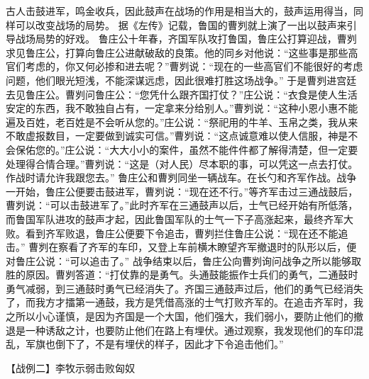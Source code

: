 \documentclass[a4paper,12pt,UTF8,twoside]{ctexbook}
\begin{document}
古人击鼓进军，鸣金收兵，因此鼓声在战场的作用是相当大的，鼓声运用得当，同样可以改变战场的局势。
据《左传》记载，鲁国的曹刿就上演了一出以鼓声来引导战场局势的好戏。
鲁庄公十年春，齐国军队攻打鲁国，鲁庄公打算迎战，曹刿求见鲁庄公，打算向鲁庄公进献破敌的良策。他的同乡对他说：“这些事是那些高官们考虑的，你又何必掺和进去呢？”曹刿说：“现在的一些高官们不能很好的考虑问题，他们眼光短浅，不能深谋远虑，因此很难打胜这场战争。”
于是曹刿进宫廷去见鲁庄公。曹刿问鲁庄公：“您凭什么跟齐国打仗？”庄公说：“衣食是使人生活安定的东西，我不敢独自占有，一定拿来分给别人。”曹刿说：“这种小恩小惠不能遍及百姓，老百姓是不会听从您的。”庄公说：“祭祀用的牛羊、玉帛之类，我从来不敢虚报数目，一定要做到诚实可信。”曹刿说：“这点诚意难以使人信服，神是不会保佑您的。”庄公说：“大大小小的案件，虽然不能件件都了解得清楚，但一定要处理得合情合理。”曹刿说：“这是（对人民）尽本职的事，可以凭这一点去打仗。作战时请允许我跟您去。”
鲁庄公和曹刿同坐一辆战车。在长勺和齐军作战。战争一开始，鲁庄公便要击鼓进军，曹刿说：“现在还不行。”等齐军击过三通战鼓后，曹刿说：“可以击鼓进军了。”此时齐军在三通鼓声以后，士气已经开始有所低落，而鲁国军队进攻的鼓声才起，因此鲁国军队的士气一下子高涨起来，最终齐军大败。看到齐军败退，鲁庄公便要下令追击，曹刿拦住鲁庄公说：“现在还不能追击。”
曹刿在察看了齐军的车印，又登上车前横木瞭望齐军撤退时的队形以后，便对鲁庄公说：“可以追击了。”
战争结束以后，鲁庄公向曹刿询问战争之所以能够取胜的原因。曹刿答道：“打仗靠的是勇气。头通鼓能振作士兵们的勇气，二通鼓时勇气减弱，到三通鼓时勇气已经消失了。齐国三通鼓声过后，他们的勇气已经消失了，而我方才擂第一通鼓，我方是凭借高涨的士气打败齐军的。在追击齐军时，我之所以小心谨慎，是因为齐国是一个大国，他们强大，我们弱小，要防止他们的撤退是一种诱敌之计，也要防止他们在路上有埋伏。通过观察，我发现他们的车印混乱，军旗也倒下了，不是有埋伏的样子，因此才下令追击他们。”


【战例二】李牧示弱击败匈奴
\end{document}
